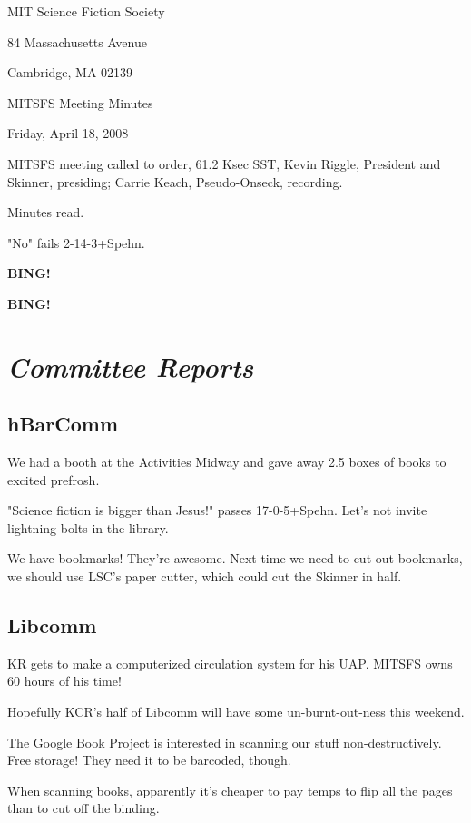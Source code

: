 \documentclass[10pt]{article}
\newcommand{\bing}{{\bf BING!} }
\newcommand{\goto}[1]{\bing \vskip 12pt \section*{{\em{#1}}}}
\begin{document}
\begin{center}

MIT Science Fiction Society

84 Massachusetts Avenue

Cambridge, MA 02139

\vspace{12pt}

MITSFS Meeting Minutes

Friday, April 18, 2008

\end{center}

\vspace{18pt}

\setlength{\parskip}{6pt}

\noindent
MITSFS meeting called to order, 61.2 Ksec SST,
Kevin Riggle, President and Skinner, presiding; Carrie Keach, Pseudo-Onseck, recording.

Minutes read.

"No" fails 2-14-3+Spehn.

\bing

\goto{Committee Reports}

\subsection*{hBarComm}

We had a booth at the Activities Midway and gave away 2.5 boxes of books 
to excited prefrosh. 

"Science fiction is bigger than Jesus!" passes 17-0-5+Spehn. Let's not 
invite lightning bolts in the library.

We have bookmarks! They're awesome. Next time we need to cut out 
bookmarks, we should use LSC's paper cutter, which could cut the Skinner 
in half.

\subsection*{Libcomm}

KR gets to make a computerized circulation system for his UAP. MITSFS owns 
60 hours of his time!

Hopefully KCR's half of Libcomm will have some un-burnt-out-ness this 
weekend.

The Google Book Project is interested in scanning our stuff 
non-destructively. Free storage! They need it to be barcoded, though.

When scanning books, apparently it's cheaper to pay temps to flip all 
the pages than to cut off the binding.
\end{document}
